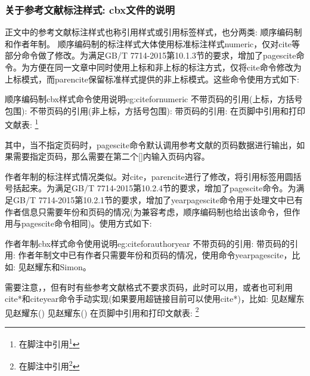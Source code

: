 \subsubsection{关于参考文献标注样式: cbx文件的说明}\label{sec:cbx:usage}
正文中的参考文献标注样式也称引用样式或引用标签样式，也分两类: 顺序编码制和作者年制。
顺序编码制的标注样式大体使用标准标注样式numeric，仅对cite等部分命令做了修改。为满足GB/T 7714-2015第10.1.3节的要求，增加了pagescite命令。为方便在同一文章中同时使用上标和非上标的标注方式，仅将cite命令修改为上标模式，而parencite保留标准样式提供的非上标模式。这些命令使用方式如下:

\begin{codetex}{顺序编码制cbx样式命令使用说明}{eg:citefornumeric}
不带页码的引用(上标，方括号包围):
    \cite{Peebles2001-100-100}
不带页码的引用(非上标，方括号包围):
    \parencite{Miroslav2004--}
带页码的引用:
    \cite[见][49页]{蔡敏2006--}  \parencite[见][49页]{Miroslav2004--}
      
在页脚中引用和打印文献表:
    \footnote{在脚注中引用\footcite{赵学功2001--}}  
\end{codetex}

其中，当不指定页码时，pagescite命令默认调用参考文献的页码数据进行输出，如果需要指定页码，那么需要在第二个[]内输入页码内容。

作者年制的标注样式情况类似。对cite，parencite进行了修改，将引用标签用圆括号括起来。为满足GB/T 7714-2015第10.2.4节的要求，增加了pagescite命令。为满足GB/T 7714-2015第10.2.1节的要求，增加了yearpagescite命令用于处理文中已有作者信息只需要年份和页码的情况(为兼容考虑，顺序编码制也给出该命令，但作用与pagescite命令相同)。使用方式如下:

\begin{codetex}{作者年制cbx样式命令使用说明}{eg:citeforauthoryear}
不带页码的引用:
    \cite{Peebles2001-100-100}  \parencite{Miroslav2004--}
带页码的引用:
    \cite[见][49页]{蔡敏2006--} \parencite[见][49页]{Miroslav2004--}
     
作者年制文中已有作者只需要年份和页码的情况，使用命令yearpagescite，比如:
    见赵耀东和Simon。

需要注意，，但有时有些参考文献格式不要求页码，此时可以用，或者也可利用cite*和citeyear命令手动实现(如果要用超链接目前可以使用cite*)，比如:
    见赵耀东
    见赵耀东(\cite*{赵耀东1998--})
    见赵耀东(\citeyear{赵耀东1998--})
在页脚中引用和打印文献表:
    \footnote{在脚注中引用\footcite{赵学功2001--}} 
\end{codetex}

